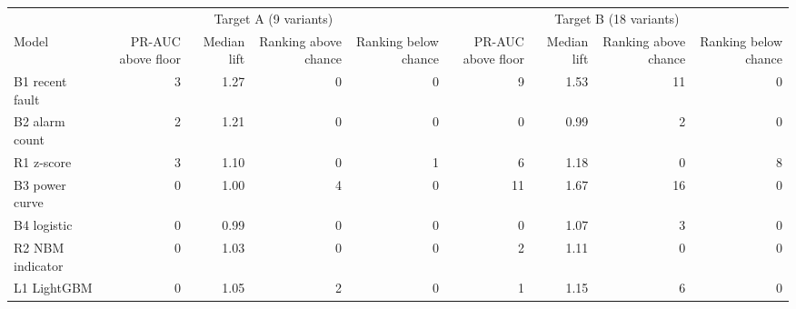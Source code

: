 \begin{tabular}{@{}lrrrrrrrr@{}}
\toprule
 & \multicolumn{4}{c}{Target A (9 variants)} & \multicolumn{4}{c}{Target B (18 variants)} \\
\cmidrule(lr){2-5}\cmidrule(lr){6-9}
Model & PR-AUC above floor & Median lift & Ranking above chance & Ranking below chance & PR-AUC above floor & Median lift & Ranking above chance & Ranking below chance \\
\midrule
B1 recent fault & 3 & 1.27 & 0 & 0 & 9 & 1.53 & 11 & 0 \\
B2 alarm count & 2 & 1.21 & 0 & 0 & 0 & 0.99 & 2 & 0 \\
R1 z-score & 3 & 1.10 & 0 & 1 & 6 & 1.18 & 0 & 8 \\
B3 power curve & 0 & 1.00 & 4 & 0 & 11 & 1.67 & 16 & 0 \\
B4 logistic & 0 & 0.99 & 0 & 0 & 0 & 1.07 & 3 & 0 \\
R2 NBM indicator & 0 & 1.03 & 0 & 0 & 2 & 1.11 & 0 & 0 \\
L1 LightGBM & 0 & 1.05 & 2 & 0 & 1 & 1.15 & 6 & 0 \\
\bottomrule
\end{tabular}

